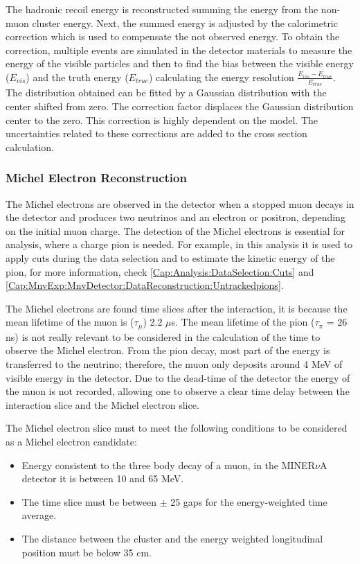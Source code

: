The hadronic recoil energy is reconstructed summing the energy from the non-muon cluster energy. Next, the summed energy is adjusted by the calorimetric correction which is used to compensate the not observed energy. To obtain the correction, multiple events are simulated in the detector materials to measure the energy of the visible particles and then to find the bias between the visible energy ($E_{vis}$) and the truth energy ($E_{true}$) calculating the energy resolution $\frac{E_{vis} - E_{true}}{E_{true}}$. The distribution obtained can be fitted by a Gaussian distribution with the center shifted from zero. The correction factor displaces the Gaussian distribution center to the zero. This correction is highly dependent on the model. The uncertainties related to these corrections are added to the cross section calculation. 

    \subsubsection{Michel Electron Reconstruction}
\label{Cap:MnvExp:MnvDetector:DataReconstruction:MichelElectron}

The Michel electrons are observed in the detector when a stopped muon decays in the detector and produces two neutrinos and an electron or positron, depending on the initial muon charge. The detection of the Michel electrons is essential for analysis, where a charge pion is needed. For example, in this analysis it is used to apply cuts during the data selection and to estimate the kinetic energy of the pion, for more information, check \ref{Cap:Analysis:DataSelection:Cuts} and \ref{Cap:MnvExp:MnvDetector:DataReconstruction:Untrackedpions}. 

The Michel electrons are found time slices after the interaction, it is because the mean lifetime of the muon is ($\tau_\mu$) 2.2 $\mu$s. The mean lifetime of the pion ($\tau_\pi$ = 26 ns) is not really relevant to be considered in the calculation of the time to observe the Michel electron. From the pion decay, most part of the energy is transferred to the neutrino; therefore, the muon only deposits around 4 MeV of visible energy in the detector. Due to the dead-time \cite{MINERvA} of the detector the energy of the muon is not recorded, allowing one to observe a clear time delay between the interaction slice and the Michel electron slice. 

The Michel electron slice must to meet the following conditions to be considered as a Michel electron candidate:
\begin{itemize}
    \item Energy consistent to the three body decay of a muon, in the MINER$\nu$A detector it is between 10 and 65 MeV. 
    \item The time slice must be between $\pm$ 25 gaps for the energy-weighted time average. 
    \item The distance between the cluster and the energy weighted longitudinal position must be below 35 cm. 
\end{itemize}


